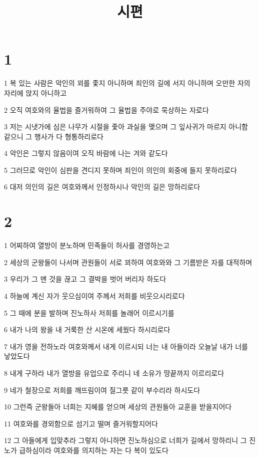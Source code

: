 

\title{시편}


\chapter{1}

\par 1 복 있는 사람은 악인의 꾀를 좇지 아니하며 죄인의 길에 서지 아니하며 오만한 자의 자리에 앉지 아니하고
\par 2 오직 여호와의 율법을 즐거워하여 그 율법을 주야로 묵상하는 자로다
\par 3 저는 시냇가에 심은 나무가 시절을 좇아 과실을 맺으며 그 잎사귀가 마르지 아니함 같으니 그 행사가 다 형통하리로다
\par 4 악인은 그렇지 않음이여 오직 바람에 나는 겨와 같도다
\par 5 그러므로 악인이 심판을 견디지 못하며 죄인이 의인의 회중에 들지 못하리로다
\par 6 대저 의인의 길은 여호와께서 인정하시나 악인의 길은 망하리로다

\chapter{2}

\par 1 어찌하여 열방이 분노하며 민족들이 허사를 경영하는고
\par 2 세상의 군왕들이 나서며 관원들이 서로 꾀하여 여호와와 그 기름받은 자를 대적하며
\par 3 우리가 그 맨 것을 끊고 그 결박을 벗어 버리자 하도다
\par 4 하늘에 계신 자가 웃으심이여 주께서 저희를 비웃으시리로다
\par 5 그 때에 분을 발하며 진노하사 저희를 놀래어 이르시기를
\par 6 내가 나의 왕을 내 거룩한 산 시온에 세웠다 하시리로다
\par 7 내가 영을 전하노라 여호와께서 내게 이르시되 너는 내 아들이라 오늘날 내가 너를 낳았도다
\par 8 내게 구하라 내가 열방을 유업으로 주리니 네 소유가 땅끝까지 이르리로다
\par 9 네가 철장으로 저희를 깨뜨림이여 질그릇 같이 부수리라 하시도다
\par 10 그런즉 군왕들아 너희는 지혜를 얻으며 세상의 관원들아 교훈을 받을지어다
\par 11 여호와를 경외함으로 섬기고 떨며 즐거워할지어다
\par 12 그 아들에게 입맞추라 그렇지 아니하면 진노하심으로 너희가 길에서 망하리니 그 진노가 급하심이라 여호와를 의지하는 자는 다 복이 있도다

